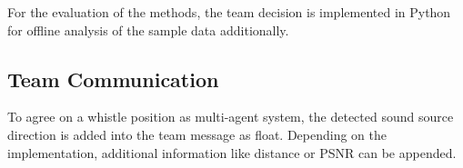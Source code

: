 For the evaluation of the methods, the team decision is implemented in
Python for offline analysis of the sample data additionally.



\subsection{Team Communication}
\label{subsec:03_teamCommunication}

To agree on a whistle position as multi-agent system, the detected sound source
direction is added into the team message as float.
Depending on the implementation, additional information like distance or
\ac{PSNR} can be appended.
